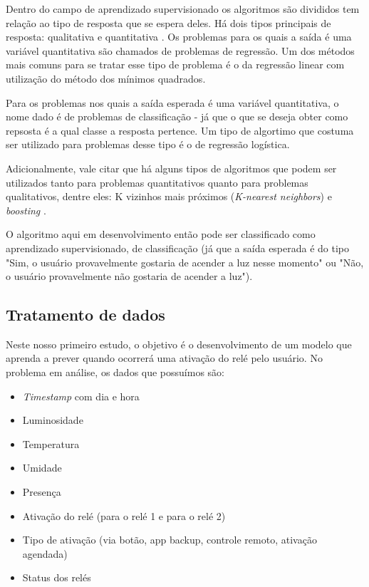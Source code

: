 			Dentro do campo de aprendizado supervisionado os algoritmos são divididos tem relação ao tipo de resposta que se espera deles. Há dois tipos principais de resposta: qualitativa e quantitativa  \cite{islr}. Os problemas para os quais a saída é uma variável quantitativa são chamados de problemas de regressão. Um dos métodos mais comuns para se tratar esse tipo de problema é o da regressão linear com utilização do método dos mínimos quadrados.

			Para os problemas nos quais a saída esperada é uma variável quantitativa, o nome dado é de problemas de classificação - já que o que se deseja obter como repsosta é a qual classe a resposta pertence. Um tipo de algortimo que costuma ser utilizado para problemas desse tipo é o de regressão logística.

			Adicionalmente, vale citar que há alguns tipos de algoritmos que podem ser utilizados tanto para problemas quantitativos quanto para problemas qualitativos, dentre eles: K vizinhos mais próximos (\emph{K-nearest neighbors}) e \emph{boosting} \cite{islr}.

			O algoritmo aqui em desenvolvimento então pode ser classificado como aprendizado supervisionado, de classificação (já que a saída esperada é do tipo "Sim, o usuário provavelmente gostaria de acender a luz nesse momento" ou "Não, o usuário provavelmente não gostaria de acender a luz").

		\subsection{Tratamento de dados}

			Neste nosso primeiro estudo, o objetivo é o desenvolvimento de um modelo que aprenda a prever quando ocorrerá uma ativação do relé pelo usuário. No problema em análise, os dados que possuímos são:

			\begin{itemize}
				\item \emph{Timestamp} com dia e hora
				\item Luminosidade
				\item Temperatura
				\item Umidade
				\item Presença
				\item Ativação do relé (para o relé 1 e para o relé 2)
				\item Tipo de ativação (via botão, app backup, controle remoto, ativação agendada)
				\item Status dos relés
			\end{itemize}

